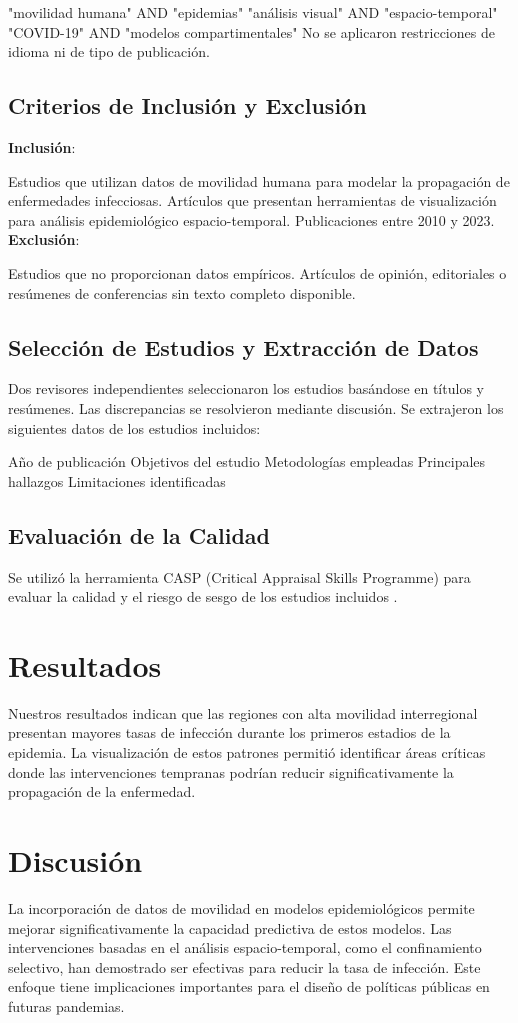 \documentclass[sigconf]{acmart}
\begin{document}
"movilidad humana" AND "epidemias"
"análisis visual" AND "espacio-temporal"
"COVID-19" AND "modelos compartimentales"
No se aplicaron restricciones de idioma ni de tipo de publicación.

\subsection{Criterios de Inclusión y Exclusión}

\textbf{Inclusión}:

Estudios que utilizan datos de movilidad humana para modelar la propagación de enfermedades infecciosas.
Artículos que presentan herramientas de visualización para análisis epidemiológico espacio-temporal.
Publicaciones entre 2010 y 2023.
\textbf{Exclusión}:

Estudios que no proporcionan datos empíricos.
Artículos de opinión, editoriales o resúmenes de conferencias sin texto completo disponible.
\subsection{Selección de Estudios y Extracción de Datos}

Dos revisores independientes seleccionaron los estudios basándose en títulos y resúmenes. Las discrepancias se resolvieron mediante discusión. Se extrajeron los siguientes datos de los estudios incluidos:

Año de publicación
Objetivos del estudio
Metodologías empleadas
Principales hallazgos
Limitaciones identificadas
\subsection{Evaluación de la Calidad}

Se utilizó la herramienta CASP (Critical Appraisal Skills Programme) para evaluar la calidad y el riesgo de sesgo de los estudios incluidos \cite{casp2018}.

\section{Resultados}
Nuestros resultados indican que las regiones con alta movilidad interregional presentan mayores tasas de infección durante los primeros estadios de la epidemia. La visualización de estos patrones permitió identificar áreas críticas donde las intervenciones tempranas podrían reducir significativamente la propagación de la enfermedad.

\section{Discusión}
La incorporación de datos de movilidad en modelos epidemiológicos permite mejorar significativamente la capacidad predictiva de estos modelos. Las intervenciones basadas en el análisis espacio-temporal, como el confinamiento selectivo, han demostrado ser efectivas para reducir la tasa de infección. Este enfoque tiene implicaciones importantes para el diseño de políticas públicas en futuras pandemias.
\end{document}
